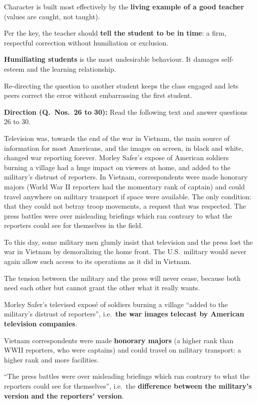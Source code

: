 Character is built most effectively by the \textbf{living example of a good teacher} (values are caught, not taught).

Per the key, the teacher should \textbf{tell the student to be in time}: a firm, respectful correction without humiliation or exclusion.

\textbf{Humiliating students} is the most undesirable behaviour. It damages self-esteem and the learning relationship.

Re-directing the question to another student keeps the class engaged and lets peers correct the error without embarrassing the first student.

\textbf{Direction (Q.~Nos.~26 to 30):} Read the following text and answer questions 26 to 30.\par\smallskip
Television was, towards the end of the war in Vietnam, the main source of information for most Americans, and the images on screen, in black and white, changed war reporting forever. Morley Safer's expose of American soldiers burning a village had a huge impact on viewers at home, and added to the military's distrust of reporters. In Vietnam, correspondents were made honorary majors (World War II reporters had the momentary rank of captain) and could travel anywhere on military transport if space were available. The only condition: that they could not betray troop movements, a request that was respected. The press battles were over misleading briefings which ran contrary to what the reporters could see for themselves in the field.

To this day, some military men glumly insist that television and the press lost the war in Vietnam by demoralizing the home front. The U.S.\ military would never again allow such access to its operations as it did in Vietnam.

The tension between the military and the press will never cease, because both need each other but cannot grant the other what it really wants.

Morley Safer's televised exposé of soldiers burning a village ``added to the military's distrust of reporters'', i.e.\ \textbf{the war images telecast by American television companies}.

Vietnam correspondents were made \textbf{honorary majors} (a higher rank than WWII reporters, who were captains) and could travel on military transport: a higher rank and more facilities.

``The press battles were over misleading briefings which ran contrary to what the reporters could see for themselves'', i.e.\ the \textbf{difference between the military's version and the reporters' version}.

